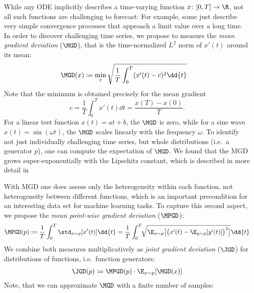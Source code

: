 While any ODE implicitly describes a time-varying function $x\colon [0,T] \to \R$,
not all such functions are challenging to forecast: For example,
some just describe very simple convergence processes that approach a limit value over a long time.
In order to discover challenging time series, we propose to measure the \emph{mean gradient deviation} ($\MGD$), that is the time-normalized $L^2$ norm of $x'(t)$ around its mean:
%
\begin{align}\label{eq:mdg}
	\MGD(x) &\coloneqq \min_{c} \sqrt{\frac{1}{T} \int_{0}^T (x'(t) - c)^2 \dd{t}}
\end{align}
%
Note that the minimum is obtained precisely for the mean gradient
%
\begin{equation}\label{eq:mgd}
	{c=\frac{1}{T}\int_{0}^T x'(t) \dd{t}} = \frac{x(T)-x(0)}{T}.
\end{equation}
%
For a linear test function $x(t) = a t + b$, the $\MGD$ is zero, while for a sine wave $x(t) = \sin(\omega t)$, the $\MGD$  scales linearly with the frequency $\omega$.
To identify not just individually challenging time series, but whole distributions (i.e.\ a generator $p$), one can compute the expectation of $\MGD$.
We found that the MGD grows super-exponentially with the Lipschitz constant, which is described in more detail in~

With MGD one does assess only the heterogeneity within each function,
not heterogeneity between different functions,
which is an important precondition for an interesting data set
for machine learning tasks. To capture this second aspect,
we propose the \emph{mean point-wise gradient deviation} ($\MPGD$):
%
\begin{align}\label{eq:mpgd}
	\MPGD(p) \coloneqq \frac{1}{T}\int_0^T  \std_{x\sim p}[x'(t)] \dd{t}
	= \frac{1}{T}\int_0^T\!\!\sqrt{%
		\E_{x\sim p}\bigl[\bigl(x'(t) - \E_{y\sim p}[y'(t)]\bigr)^2\bigr]
	}\dd{t}
\end{align}
%
We combine both measures multiplicatively as \emph{joint gradient deviation} ($\JGD$) for
distributions of functions, i.e.\ function generators:
%
\begin{align}\label{eq:jgd}
   \JGD(p) \coloneqq \MPGD(p) \cdot \E_{x\sim p}[\MGD(x)]
\end{align}
%
Note, that we can approximate $\MGD$ with a finite number of
samples:

